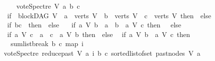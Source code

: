 \begin{isabellebody}
\ \ \isanewline
\ \ {\isachardoublequoteopen}vote{\isacharunderscore}{\kern0pt}Spectre\ V\ a\ b\ c\ {\isacharequal}{\kern0pt}\ {\isacharparenleft}{\kern0pt}\isanewline
\ \ if\ {\isacharparenleft}{\kern0pt}{\isasymnot}\ blockDAG\ V\ {\isasymor}\ a\ {\isasymnotin}\ verts\ V\ {\isasymor}\ b\ {\isasymnotin}\ verts\ V\ {\isasymor}\ c\ {\isasymnotin}\ verts\ V{\isacharparenright}{\kern0pt}\ then\ {}\ else\ \isanewline
\ \ if\ {\isacharparenleft}{\kern0pt}b{\isacharequal}{\kern0pt}c{\isacharparenright}{\kern0pt}\ \ then\ {}\ else\ \isanewline
\ \ if\ {\isacharparenleft}{\kern0pt}{\isacharparenleft}{\kern0pt}{\isacharparenleft}{\kern0pt}a\ {\isasymrightarrow}\isactrlsup {\isacharplus}{\kern0pt}\isactrlbsub V\isactrlesub \ b{\isacharparenright}{\kern0pt}\ {\isasymor}\ a\ {\isacharequal}{\kern0pt}\ b{\isacharparenright}{\kern0pt}\ {\isasymand}\ {\isasymnot}{\isacharparenleft}{\kern0pt}a\ {\isasymrightarrow}\isactrlsup {\isacharplus}{\kern0pt}\isactrlbsub V\isactrlesub \ c{\isacharparenright}{\kern0pt}{\isacharparenright}{\kern0pt}\ then\ {}\ \ else\isanewline
\ \ if\ {\isacharparenleft}{\kern0pt}{\isacharparenleft}{\kern0pt}{\isacharparenleft}{\kern0pt}a\ {\isasymrightarrow}\isactrlsup {\isacharplus}{\kern0pt}\isactrlbsub V\isactrlesub \ c{\isacharparenright}{\kern0pt}\ {\isasymor}\ a\ {\isacharequal}{\kern0pt}\ c{\isacharparenright}{\kern0pt}\ {\isasymand}\ {\isasymnot}{\isacharparenleft}{\kern0pt}a\ {\isasymrightarrow}\isactrlsup {\isacharplus}{\kern0pt}\isactrlbsub V\isactrlesub \ b{\isacharparenright}{\kern0pt}{\isacharparenright}{\kern0pt}\ then\ {\isacharminus}{\kern0pt}{}\ else\isanewline
\ \ if\ {\isacharparenleft}{\kern0pt}{\isacharparenleft}{\kern0pt}a\ {\isasymrightarrow}\isactrlsup {\isacharplus}{\kern0pt}\isactrlbsub V\isactrlesub \ b{\isacharparenright}{\kern0pt}\ {\isasymand}\ {\isacharparenleft}{\kern0pt}a\ {\isasymrightarrow}\isactrlsup {\isacharplus}{\kern0pt}\isactrlbsub V\isactrlesub \ c{\isacharparenright}{\kern0pt}{\isacharparenright}{\kern0pt}\ then\ \isanewline
\ \ \ {\isacharparenleft}{\kern0pt}sumlist{\isacharunderscore}{\kern0pt}break\ b\ c\ {\isacharparenleft}{\kern0pt}map\ {\isacharparenleft}{\kern0pt}{\isasymlambda}i{\isachardot}{\kern0pt}\isanewline
\ {\isacharparenleft}{\kern0pt}vote{\isacharunderscore}{\kern0pt}Spectre\ {\isacharparenleft}{\kern0pt}reduce{\isacharunderscore}{\kern0pt}past\ V\ a{\isacharparenright}{\kern0pt}\ i\ b\ c{\isacharparenright}{\kern0pt}{\isacharparenright}{\kern0pt}\ {\isacharparenleft}{\kern0pt}sorted{\isacharunderscore}{\kern0pt}list{\isacharunderscore}{\kern0pt}of{\isacharunderscore}{\kern0pt}set\ {\isacharparenleft}{\kern0pt}past{\isacharunderscore}{\kern0pt}nodes\ V\ a{\isacharparenright}{\kern0pt}{\isacharparenright}{\kern0pt}{\isacharparenright}{\kern0pt}{\isacharparenright}{\kern0pt}\isanewline

\end{isabellebody}
